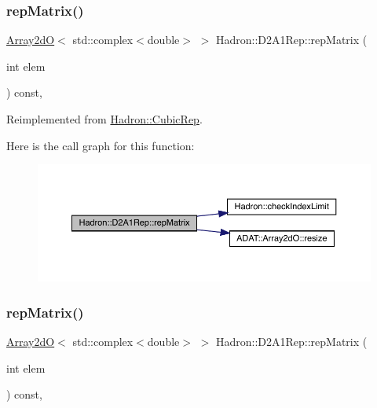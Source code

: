 \subsubsection{\texorpdfstring{repMatrix()}{repMatrix()}\hspace{0.1cm}{\footnotesize\ttfamily [1/3]}}
{\footnotesize\ttfamily \mbox{\hyperlink{classADAT_1_1Array2dO}{Array2dO}}$<$ std\+::complex$<$double$>$ $>$ Hadron\+::\+D2\+A1\+Rep\+::rep\+Matrix (\begin{DoxyParamCaption}\item[{int}]{elem }\end{DoxyParamCaption}) const\hspace{0.3cm}{\ttfamily [inline]}, {\ttfamily [virtual]}}



Reimplemented from \mbox{\hyperlink{structHadron_1_1CubicRep_ac5d7e9e6f4ab1158b5fce3e4ad9e8005}{Hadron\+::\+Cubic\+Rep}}.

Here is the call graph for this function\+:
\nopagebreak
\begin{figure}[H]
\begin{center}
\leavevmode
\includegraphics[width=350pt]{d5/d28/structHadron_1_1D2A1Rep_a0d9bec731ada6fec10956dce667b2ffd_cgraph}
\end{center}
\end{figure}
\mbox{\label{structHadron_1_1D2A1Rep_a0d9bec731ada6fec10956dce667b2ffd}} 
\subsubsection{\texorpdfstring{repMatrix()}{repMatrix()}\hspace{0.1cm}{\footnotesize\ttfamily [2/3]}}
{\footnotesize\ttfamily \mbox{\hyperlink{classADAT_1_1Array2dO}{Array2dO}}$<$ std\+::complex$<$double$>$ $>$ Hadron\+::\+D2\+A1\+Rep\+::rep\+Matrix (\begin{DoxyParamCaption}\item[{int}]{elem }\end{DoxyParamCaption}) const\hspace{0.3cm}{\ttfamily [inline]}, {\ttfamily [virtual]}}



